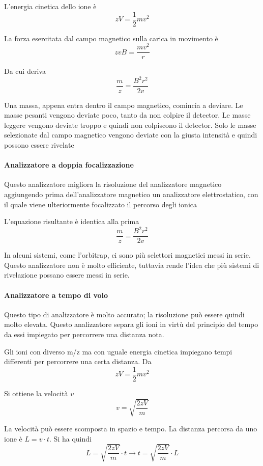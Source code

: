 
L'energia cinetica dello ione è
\[
zV = \frac{1}{2} mv^2
\]

La forza esercitata dal campo magnetico sulla carica in movimento è 
\[
zvB = \frac{mv^2}{r}
\]

Da cui deriva
\[
\frac{m}{z} = \frac{B^2r^2}{2v}
\]

Una massa, appena entra dentro il campo magnetico, comincia a deviare.
Le masse pesanti vengono deviate poco, tanto da non colpire il detector.
Le masse leggere vengono deviate troppo e quindi non colpiscono il detector.
Solo le masse selezionate dal campo magnetico vengono deviate con la giusta intensità e quindi possono essere rivelate

\paragraph{Analizzatore a doppia focalizzazione}
Questo analizzatore migliora la risoluzione del analizzatore magnetico aggiungendo prima dell'analizzatore magnetico un analizzatore elettrostatico, con il quale viene ulteriormente focalizzato il percorso degli ionica


L'equazione risultante è identica alla prima
\[
\frac{m}{z} = \frac{B^2r^2}{2v}
\]

In alcuni sistemi, come l'orbitrap, ci sono più selettori magnetici messi in serie.
Questo analizzatore non è molto efficiente, tuttavia rende l'idea che più sistemi di rivelazione possano essere messi in serie.

\paragraph{Analizzatore a tempo di volo}
Questo tipo di analizzatore è molto accurato; la risoluzione può essere quindi molto elevata.
Questo analizzatore separa gli ioni in virtù del principio del tempo da essi impiegato per percorrere una distanza nota.


Gli ioni con diverso m/z ma con uguale energia cinetica impiegano tempi differenti per percorrere una certa distanza.
Da
\[
zV = \frac{1}{2} mv^2
\]

Si ottiene la velocità $v$
\[
v = \sqrt{\frac{2zV}{m}}
\]

La velocità può essere scomposta in spazio e tempo. La distanza percorsa da uno ione è $L = v \cdot t$.
Si ha quindi
\[
L = \sqrt{\frac{2zV}{m}} \cdot t \rightarrow t = \sqrt{\frac{2zV}{m}} \cdot L
\]

